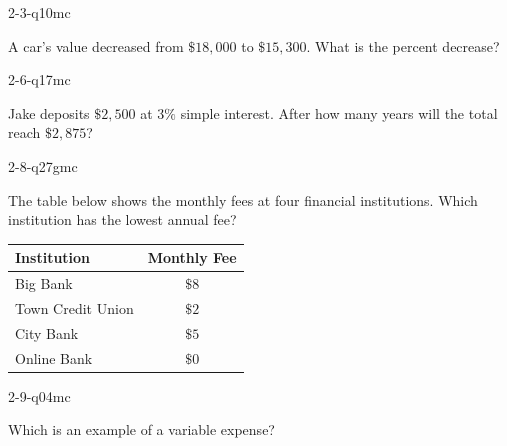 \begin{practiceQuestion}{2-3-q10}{mc}
\begin{questionText}
A car's value decreased from $\$18{,}000$ to $\$15{,}300$. What is the percent decrease?
\end{questionText}
\end{practiceQuestion}

\begin{practiceQuestion}{2-6-q17}{mc}
\begin{questionText}
Jake deposits $\$2{,}500$ at $3\%$ simple interest. After how many years will the total reach $\$2{,}875$?
\end{questionText}
\end{practiceQuestion}

\begin{practiceQuestion}{2-8-q27}{gmc}
\begin{questionText}
The table below shows the monthly fees at four financial institutions. Which institution has the lowest annual fee?

\begin{center}
\begin{tabular}{|l|c|}
\hline
\textbf{Institution} & \textbf{Monthly Fee} \\
\hline
Big Bank & $\$8$ \\
\hline
Town Credit Union & $\$2$ \\
\hline
City Bank & $\$5$ \\
\hline
Online Bank & $\$0$ \\
\hline
\end{tabular}
\end{center}
\end{questionText}
\end{practiceQuestion}

\begin{practiceQuestion}{2-9-q04}{mc}
\begin{questionText}
Which is an example of a variable expense?
\end{questionText}
\end{practiceQuestion}

